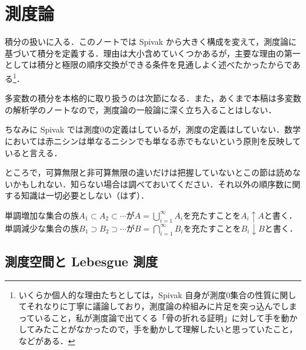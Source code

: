 \section{測度論}

積分の扱いに入る．このノートでは Spivak から大きく構成を変えて，測度論に基づいて積分を定義する．理由は大小含めていくつかあるが，主要な理由の第一としては積分と極限の順序交換ができる条件を見通しよく述べたかったからである\footnote{いくらか個人的な理由たちとしては，Spivak 自身が測度0集合の性質に関してそれなりに丁寧に議論しており，測度論の枠組みに片足を突っ込んでしまっていること，私が測度論で出てくる「骨の折れる証明」に対して手を動かしてみたことがなかったので，手を動かして理解したいと思っていたこと，などがある．}．

多変数の積分を本格的に取り扱うのは次節になる．また，あくまで本稿は多変数の解析学のノートなので，測度論の一般論に深く立ち入ることはしない．

\begin{dig}
ちなみに Spivak では測度0の定義はしているが，測度の定義はしていない．数学においては赤ニシンは単なるニシンでも単なる赤でもないという原則を反映していると言える．
\end{dig}

\begin{que}
ところで，可算無限と非可算無限の違いだけは把握していないとこの節は読めないかもしれない．知らない場合は調べておいてください．それ以外の順序数に関する知識は一切必要としない（はず）．
\end{que}

\begin{defi}
単調増加な集合の族$A_1 \subset A_2 \subset \dotsb$が$A = \bigcup_{i=1}^\infty A_i$を充たすことを$A_i \uparrow A$と書く．単調減少な集合の族$B_1 \supset B_2 \supset \dotsb$が$B = \bigcap_{i=1}^\infty B_i$を充たすことを$B_i \downarrow B$と書く．
\end{defi}

\subsection{測度空間と Lebesgue 測度}

